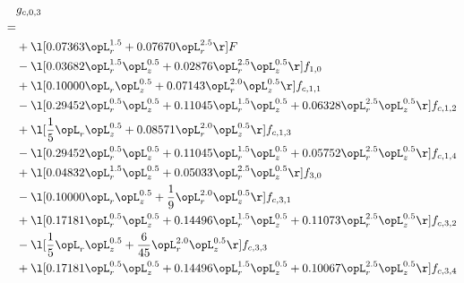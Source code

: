 \begin{alignat}{2} 
\label{eq:g_03_0} 
& g_{c,0,3} \nonumber \\ 
 = \\ 
& + \l[  0.07363 \opL_r^{1.5} +  0.07670 \opL_r^{2.5}  \r] F \nonumber \\ 
& - \l[  0.03682 \opL_r^{1.5} \opL_z^{0.5} +  0.02876 \opL_r^{2.5} \opL_z^{0.5}  \r] f_{1,0} \nonumber \\ 
& + \l[  0.10000 \opL_r \opL_z^{0.5} +  0.07143 \opL_r^{2.0} \opL_z^{0.5}  \r] f_{c,1,1} \nonumber \\ 
& - \l[  0.29452 \opL_r^{0.5} \opL_z^{0.5} +  0.11045 \opL_r^{1.5} \opL_z^{0.5} +  0.06328 \opL_r^{2.5} \opL_z^{0.5}  \r] f_{c,1,2} \nonumber \\ 
& + \l[ \frac{1}{5} \opL_r \opL_z^{0.5} +  0.08571 \opL_r^{2.0} \opL_z^{0.5}  \r] f_{c,1,3} \nonumber \\ 
& - \l[  0.29452 \opL_r^{0.5} \opL_z^{0.5} +  0.11045 \opL_r^{1.5} \opL_z^{0.5} +  0.05752 \opL_r^{2.5} \opL_z^{0.5}  \r] f_{c,1,4} \nonumber \\ 
& + \l[  0.04832 \opL_r^{1.5} \opL_z^{0.5} +  0.05033 \opL_r^{2.5} \opL_z^{0.5}  \r] f_{3,0} \nonumber \\ 
& - \l[  0.10000 \opL_r \opL_z^{0.5} + \frac{1}{9} \opL_r^{2.0} \opL_z^{0.5}  \r] f_{c,3,1} \nonumber \\ 
& + \l[  0.17181 \opL_r^{0.5} \opL_z^{0.5} +  0.14496 \opL_r^{1.5} \opL_z^{0.5} +  0.11073 \opL_r^{2.5} \opL_z^{0.5}  \r] f_{c,3,2} \nonumber \\ 
& - \l[ \frac{1}{5} \opL_r \opL_z^{0.5} + \frac{6}{45} \opL_r^{2.0} \opL_z^{0.5}  \r] f_{c,3,3} \nonumber \\ 
& + \l[  0.17181 \opL_r^{0.5} \opL_z^{0.5} +  0.14496 \opL_r^{1.5} \opL_z^{0.5} +  0.10067 \opL_r^{2.5} \opL_z^{0.5}  \r] f_{c,3,4} \nonumber \\ 
\end{alignat} 


